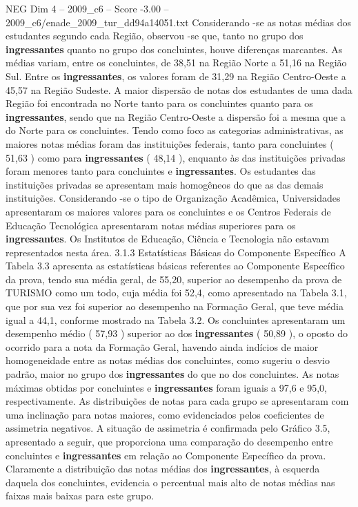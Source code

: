 \begin{textsample}{NEG Dim 4 – 2009\_c6 – Score -3.00 – 2009\_c6/enade\_2009\_tur\_dd94a14051.txt}
Considerando -se as notas médias dos estudantes segundo cada Região, observou -se que, tanto no grupo dos \textbf{ingressantes} quanto no grupo dos concluintes, houve diferenças marcantes.
As médias variam, entre os concluintes, de 38,51 na Região Norte a 51,16 na Região Sul.
Entre os \textbf{ingressantes}, os valores foram de 31,29 na Região Centro-Oeste a 45,57 na Região Sudeste.
A maior dispersão de notas dos estudantes de uma dada Região foi encontrada no Norte tanto para os concluintes quanto para os \textbf{ingressantes}, sendo que na Região Centro-Oeste a dispersão foi a mesma que a do Norte para os concluintes.
Tendo como foco as categorias administrativas, as maiores notas médias foram das instituições federais, tanto para concluintes ( 51,63 ) como para \textbf{ingressantes} ( 48,14 ), enquanto às das instituições privadas foram menores tanto para concluintes e \textbf{ingressantes}.
Os estudantes das instituições privadas se apresentam mais homogêneos do que as das demais instituições.
Considerando -se o tipo de Organização Acadêmica, Universidades apresentaram os maiores valores para os concluintes e os Centros Federais de Educação Tecnológica apresentaram notas médias superiores para os \textbf{ingressantes}.
Os Institutos de Educação, Ciência e Tecnologia não estavam representados nesta área. 3.1.3 Estatísticas Básicas do Componente Específico A Tabela 3.3 apresenta as estatísticas básicas referentes ao Componente Específico da prova, tendo sua média geral, de 55,20, superior ao desempenho da prova de TURISMO como um todo, cuja média foi 52,4, como apresentado na Tabela 3.1, que por sua vez foi superior ao desempenho na Formação Geral, que teve média igual a 44,1, conforme mostrado na Tabela 3.2.
Os concluintes apresentaram um desempenho médio ( 57,93 ) superior ao dos \textbf{ingressantes} ( 50,89 ), o oposto do ocorrido para a nota da Formação Geral, havendo ainda indícios de maior homogeneidade entre as notas médias dos concluintes, como sugeriu o desvio padrão, maior no grupo dos \textbf{ingressantes} do que no dos concluintes.
As notas máximas obtidas por concluintes e \textbf{ingressantes} foram iguais a 97,6 e 95,0, respectivamente.
As distribuições de notas para cada grupo se apresentaram com uma inclinação para notas maiores, como evidenciados pelos coeficientes de assimetria negativos.
A situação de assimetria é confirmada pelo Gráfico 3.5, apresentado a seguir, que proporciona uma comparação do desempenho entre concluintes e \textbf{ingressantes} em relação ao Componente Específico da prova.
Claramente a distribuição das notas médias dos \textbf{ingressantes}, à esquerda daquela dos concluintes, evidencia o percentual mais alto de notas médias nas faixas mais baixas para este grupo.

\end{textsample}
